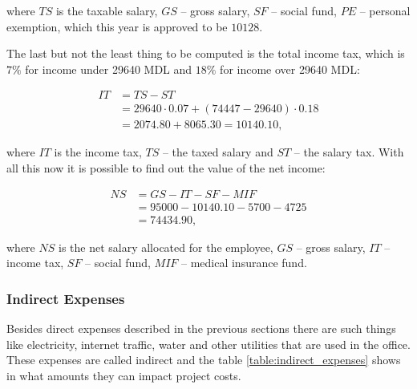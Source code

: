 \noindent where $TS$ is the taxable salary, $GS$ -- gross salary, $SF$ -- social
fund, $PE$ -- personal exemption, which this year is approved to be $10128$.

The last but not the least thing to be computed is the total income tax, which
is $7\%$ for income under 29640 MDL and $18\%$ for income over 29640 MDL:

\begin{equation}
\begin{split}
 IT &= TS - ST \\
      &= 29640 \cdot 0.07 + (74447 - 29640) \cdot 0.18 \\
      & = 2074.80 + 8065.30 = 10140.10,
 \end{split}
\end{equation}

\noindent where $IT$ is the income tax, $TS$ -- the taxed salary and $ST$ --
the salary tax. With all this now it is possible to find out the value of the
net income:

\begin{equation}
\begin{split}
 NS &= GS - IT - SF - MIF \\
            &= 95000 - 10140.10 - 5700 - 4725 \\
            &= 74434.90,
\end{split}
\end{equation}

\noindent where $NS$ is the net salary allocated for the employee, $GS$ -- gross
salary, $IT$ -- income tax, $SF$ -- social fund, $MIF$ -- medical insurance
fund.


\subsubsection{Indirect Expenses}

Besides direct expenses described in the previous sections there are such
things like electricity, internet traffic, water and other utilities that are
used in the office. These expenses are called indirect and the table
\ref{table:indirect_expenses} shows in what amounts they can impact project
costs.

